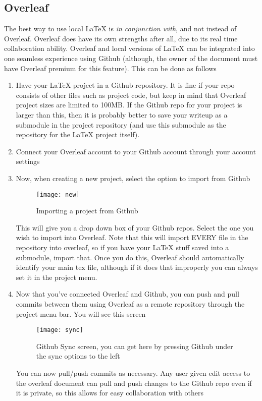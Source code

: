 \graphicspath{{Parts/3_Integrations/graphics/}}
\subsection{Overleaf}
The best way to use local \LaTeX{} is \emph{in conjunction with}, and not instead of Overleaf. Overleaf does have its own strengths after all, due to its real time collaboration ability. Overleaf and local versions of \LaTeX{} can be integrated into one seamless experience using Github (although, the owner of the document must have Overleaf premium for this feature). This can be done as follows
\begin{enumerate}
    \item Have your \LaTeX{} project in a Github repository. It is fine if your repo consists of other files such as project code, but keep in mind that Overleaf project sizes are limited to 100MB. If the Github repo for your project is larger than this, then it is probably better to save your writeup as a submodule in the project repository (and use this submodule as the repository for the \LaTeX{} project itself).
    \item Connect your Overleaf account to your Github account through your account settings
    \item Now, when creating a new project, select the option to import from Github
    \begin{figure}[ht!]
        \centering
        \texttt{[image: new]}
        \caption{Importing a project from Github}
    \end{figure}
    This will give you a drop down box of your Github repos. Select the one you wish to import into Overleaf. Note that this will import EVERY file in the repository into overleaf, so if you have your \LaTeX{} stuff saved into a submodule, import that. Once you do this, Overleaf should automatically identify your main tex file, although if it does that improperly you can always set it in the project menu.

    \item 
    Now that you've connected Overleaf and Github, you can push and pull commits between them using Overleaf as a remote repository through the project menu bar. You will see this screen
    \newpage
    \begin{figure}[ht!]
        \centering
        \texttt{[image: sync]}
        \caption{Github Sync screen, you can get here by pressing Github under the sync options to the left}
    \end{figure}
    You can now pull/push commits as necessary. Any user given edit access to the overleaf document can pull and push changes to the Github repo even if it is private, so this allows for easy collaboration with others


\end{enumerate}
